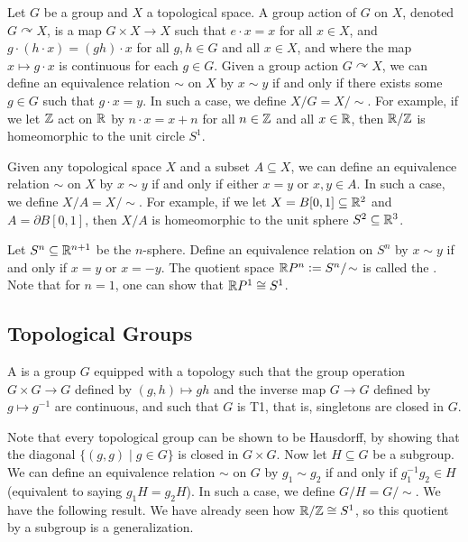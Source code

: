 Let $G$ be a group and $X$ a topological space. A group action of $G$ on $X$, denoted $G \curvearrowright X$, is a map $G \times X \to X$ such that $e \cdot x = x$ for all $x \in X$, and $g \cdot (h \cdot x) = (gh) \cdot x$ for all $g,h \in G$ and all $x \in X$, and where the map $x \mapsto g \cdot x$ is continuous for each $g \in G$. Given a group action $G \curvearrowright X$, we can define an equivalence relation $\sim$ on $X$ by $x \sim y$ if and only if there exists some $g \in G$ such that $g \cdot x = y$. In such a case, we define $X/G = X/\!\sim$. For example, if we let $\mathbb{Z}$ act on $\mathbb{R}$ by $n \cdot x = x + n$ for all $n \in \mathbb{Z}$ and all $x \in \mathbb{R}$, then $\mathbb{R}/\mathbb{Z}$ is homeomorphic to the unit circle $S^{1}$.

Given any topological space $X$ and a subset $A \subseteq X$, we can define an equivalence relation $\sim$ on $X$ by $x \sim y$ if and only if either $x = y$ or $x,y \in A$. In such a case, we define $X/A = X/\!\sim$. For example, if we let $X = B[0,1] \subseteq \mathbb{R}^{2}$ and $A = \partial B[0,1]$, then $X/A$ is homeomorphic to the unit sphere $S^{2} \subseteq \mathbb{R}^{3}$.

Let $S^{n} \subseteq \mathbb{R}^{n+1}$ be the $n$-sphere. Define an equivalence relation on $S^{n}$ by $x \sim y$ if and only if $x = y$ or $x = -y$. The quotient space $\mathbb{R} P^{n} \vcentcolon= S^{n}/\!\sim$ is called the . Note that for $n = 1$, one can show that $\mathbb{R} P^{1} \cong S^{1}$.

\subsection{Topological Groups}

\begin{definition}
    A  is a group $G$ equipped with a topology such that the group operation $G \times G \to G$ defined by $(g,h) \mapsto gh$ and the inverse map $G \to G$ defined by $g \mapsto g^{-1}$ are continuous, and such that $G$ is T1, that is, singletons are closed in $G$.
\end{definition}

Note that every topological group can be shown to be Hausdorff, by showing that the diagonal $\{(g,g) \mid g \in G\}$ is closed in $G \times G$. Now let $H \subseteq G$ be a subgroup. We can define an equivalence relation $\sim$ on $G$ by $g_{1} \sim g_{2}$ if and only if $g_{1}^{-1}g_{2} \in H$ (equivalent to saying $g_{1}H = g_{2}H$). In such a case, we define $G/H = G/\!\sim$. We have the following result. We have already seen how $\mathbb{R}/\mathbb{Z} \cong S^{1}$, so this quotient by a subgroup is a generalization.

